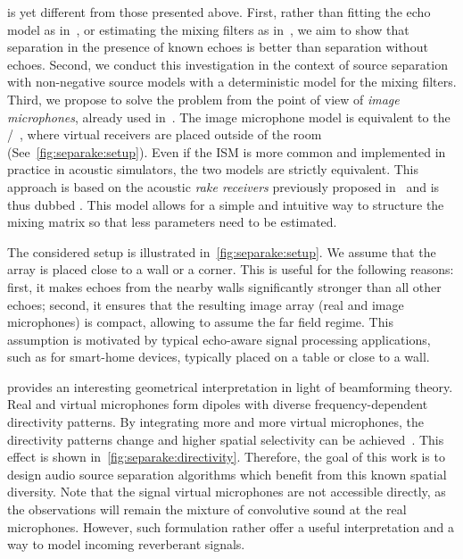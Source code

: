  is yet different from those presented above.
First, rather than fitting the echo model as in~, or estimating the mixing filters as in~,
we aim to show that separation in the presence of known echoes is better than separation without echoes.
Second, we conduct this investigation in the context of source separation with non-negative source models with a deterministic model for the mixing filters.
Third, we propose to solve the problem from the point of view of \textit{image microphones}, already used in~.
The image microphone model is equivalent to the \ISMdef/~, where virtual receivers are placed outside of the room (See~\cref{fig:separake:setup}).
Even if the \ac{ISM} is more common and implemented in practice in acoustic simulators, the two models are strictly equivalent.
This approach is based on the acoustic \textit{rake receivers} previously proposed in~ and is thus dubbed .
This model allows for a simple and intuitive way to structure the mixing matrix so that less parameters need to be estimated.

\mynewline
The considered setup is illustrated in~\cref{fig:separake:setup}.
We assume that the array is placed close to a wall or a corner.
This is useful for the following reasons:
first, it makes echoes from the nearby walls significantly stronger than all other echoes;
second, it ensures that the resulting image array (real and image microphones) is compact, allowing to assume the far field regime.
This assumption is motivated by typical echo-aware signal processing applications, such as for smart-home devices, typically placed on a table or close to a wall.

 provides an interesting geometrical interpretation in light of beamforming theory.
Real and virtual microphones form dipoles with diverse frequency-dependent directivity patterns.
By integrating more and more virtual microphones, the directivity patterns change and higher spatial selectivity can be achieved~.
This effect is shown in~\cref{fig:separake:directivity}.
Therefore, the goal of this work is to design audio source separation algorithms which benefit from this known spatial diversity.
Note that the signal virtual microphones are not accessible directly, as the observations will remain the mixture of convolutive sound at the real microphones.
However, such formulation rather offer a useful interpretation and a way to model incoming reverberant signals.

